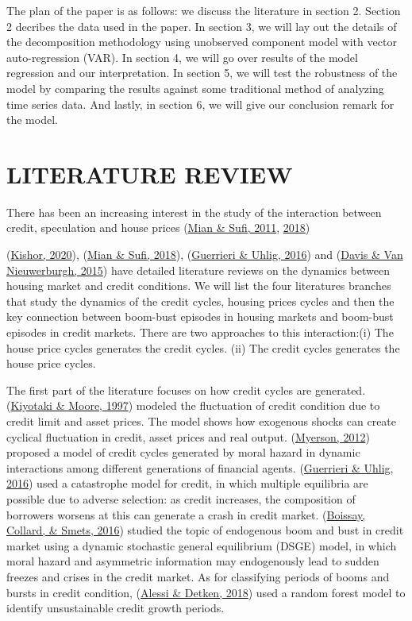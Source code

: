 \documentclass[
  12pt,
]{article}
\begin{document}
The plan of the paper is as follows: we discuss the literature in section 2. Section 2 decribes the data used in the paper. In section 3, we will lay out the details of the decomposition methodology using unobserved component model with vector auto-regression (VAR). In section 4, we will go over results of the model regression and our interpretation. In section 5, we will test the robustness of the model by comparing the results against some traditional method of analyzing time series data. And lastly, in section 6, we will give our conclusion remark for the model.

\hypertarget{Literature Review}{%
\section{LITERATURE REVIEW}\label{Literature Review}}
There has been an increasing interest in the study of the interaction between credit, speculation and house prices (\protect\hyperlink{ref-mian_house_2011}{Mian \& Sufi, 2011}, \protect\hyperlink{ref-mian_credit_2018}{2018})

(\protect\hyperlink{ref-kishor_forecasting_2020}{Kishor, 2020}), (\protect\hyperlink{ref-mian_credit_2018}{Mian \& Sufi, 2018}), (\protect\hyperlink{ref-guerrieri_housing_2016}{Guerrieri \& Uhlig, 2016}) and (\protect\hyperlink{ref-davis_housing_2015}{Davis \& Van Nieuwerburgh, 2015}) have detailed literature reviews on the dynamics between housing market and credit conditions. We will list the four literatures branches that study the dynamics of the credit cycles, housing prices cycles and then the key connection between boom-bust episodes in housing markets and boom-bust episodes in credit markets. There are two approaches to this interaction:(i) The house price cycles generates the credit cycles. (ii) The credit cycles generates the house price cycles.

The first part of the literature focuses on how credit cycles are generated. (\protect\hyperlink{ref-kiyotaki_credit_1997}{Kiyotaki \& Moore, 1997}) modeled the fluctuation of credit condition due to credit limit and asset prices. The model shows how exogenous shocks can create cyclical fluctuation in credit, asset prices and real output. (\protect\hyperlink{ref-myerson_model_2012}{Myerson, 2012}) proposed a model of credit cycles generated by moral hazard in dynamic interactions among different generations of financial agents. (\protect\hyperlink{ref-guerrieri_housing_2016}{Guerrieri \& Uhlig, 2016}) used a catastrophe model for credit, in which multiple equilibria are possible due to adverse selection: as credit increases, the composition of borrowers worsens at this can generate a crash in credit market. (\protect\hyperlink{ref-boissay_booms_2016}{Boissay, Collard, \& Smets, 2016}) studied the topic of endogenous boom and bust in credit market using a dynamic stochastic general equilibrium (DSGE) model, in which moral hazard and asymmetric information may endogenously lead to sudden freezes and crises in the credit market. As for classifying periods of booms and bursts in credit condition, (\protect\hyperlink{ref-alessi_identifying_2018}{Alessi \& Detken, 2018}) used a random forest model to identify unsustainable credit growth periods.
\end{document}

